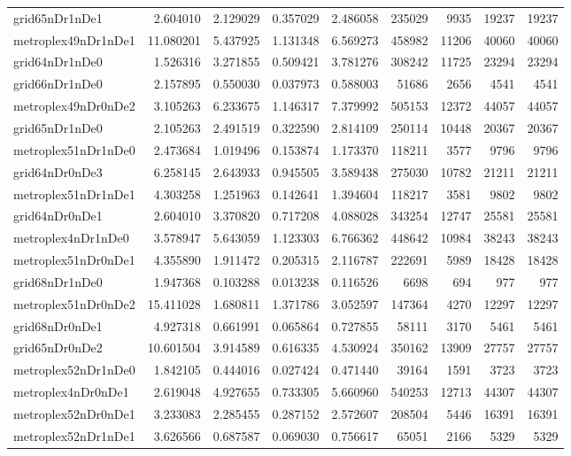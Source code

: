 \begin{longtable}{|l|r|r|r|r|r|r|r|r|}
grid65nDr1nDe1 & 2.604010 & 2.129029 & 0.357029 & 2.486058 & 235029 & 9935 & 19237 & 19237 \\
metroplex49nDr1nDe1 & 11.080201 & 5.437925 & 1.131348 & 6.569273 & 458982 & 11206 & 40060 & 40060 \\
grid64nDr1nDe0 & 1.526316 & 3.271855 & 0.509421 & 3.781276 & 308242 & 11725 & 23294 & 23294 \\
grid66nDr1nDe0 & 2.157895 & 0.550030 & 0.037973 & 0.588003 & 51686 & 2656 & 4541 & 4541 \\
metroplex49nDr0nDe2 & 3.105263 & 6.233675 & 1.146317 & 7.379992 & 505153 & 12372 & 44057 & 44057 \\
grid65nDr1nDe0 & 2.105263 & 2.491519 & 0.322590 & 2.814109 & 250114 & 10448 & 20367 & 20367 \\
metroplex51nDr1nDe0 & 2.473684 & 1.019496 & 0.153874 & 1.173370 & 118211 & 3577 & 9796 & 9796 \\
grid64nDr0nDe3 & 6.258145 & 2.643933 & 0.945505 & 3.589438 & 275030 & 10782 & 21211 & 21211 \\
metroplex51nDr1nDe1 & 4.303258 & 1.251963 & 0.142641 & 1.394604 & 118217 & 3581 & 9802 & 9802 \\
grid64nDr0nDe1 & 2.604010 & 3.370820 & 0.717208 & 4.088028 & 343254 & 12747 & 25581 & 25581 \\
metroplex4nDr1nDe0 & 3.578947 & 5.643059 & 1.123303 & 6.766362 & 448642 & 10984 & 38243 & 38243 \\
metroplex51nDr0nDe1 & 4.355890 & 1.911472 & 0.205315 & 2.116787 & 222691 & 5989 & 18428 & 18428 \\
grid68nDr1nDe0 & 1.947368 & 0.103288 & 0.013238 & 0.116526 & 6698 & 694 & 977 & 977 \\
metroplex51nDr0nDe2 & 15.411028 & 1.680811 & 1.371786 & 3.052597 & 147364 & 4270 & 12297 & 12297 \\
grid68nDr0nDe1 & 4.927318 & 0.661991 & 0.065864 & 0.727855 & 58111 & 3170 & 5461 & 5461 \\
grid65nDr0nDe2 & 10.601504 & 3.914589 & 0.616335 & 4.530924 & 350162 & 13909 & 27757 & 27757 \\
metroplex52nDr1nDe0 & 1.842105 & 0.444016 & 0.027424 & 0.471440 & 39164 & 1591 & 3723 & 3723 \\
metroplex4nDr0nDe1 & 2.619048 & 4.927655 & 0.733305 & 5.660960 & 540253 & 12713 & 44307 & 44307 \\
metroplex52nDr0nDe1 & 3.233083 & 2.285455 & 0.287152 & 2.572607 & 208504 & 5446 & 16391 & 16391 \\
metroplex52nDr1nDe1 & 3.626566 & 0.687587 & 0.069030 & 0.756617 & 65051 & 2166 & 5329 & 5329 \\

\end{longtable}
